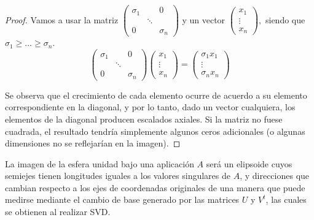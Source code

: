 \begin{proof} Vamos a usar la matriz $\begin{pmatrix}
			\sigma_1 &        & 0        \\
			         & \ddots &          \\
			0        &        & \sigma_n
		\end{pmatrix}$ y un vector $\begin{pmatrix}
			x_1    \\
			\vdots \\
			x_n
		\end{pmatrix},$ siendo que $\sigma_1 \geq \dots \geq \sigma_n$.
	\[\begin{pmatrix}
			\sigma_1 &        & 0        \\
			         & \ddots &          \\
			0        &        & \sigma_n
		\end{pmatrix}
		\begin{pmatrix}
			x_1    \\
			\vdots \\
			x_n
		\end{pmatrix}
		=
		\begin{pmatrix}
			\sigma_1 x_1 \\
			\vdots       \\
			\sigma_n x_n
		\end{pmatrix}
	\]

	Se observa que el crecimiento de cada elemento ocurre de acuerdo a su elemento correspondiente en la diagonal, y por lo tanto, dado un vector cualquiera, los elementos de la diagonal producen escalados axiales. Si la matriz no fuese cuadrada, el resultado tendría simplemente algunos ceros adicionales (o algunas dimensiones no se reflejarían en la imagen).
\end{proof}

\begin{theorem} La imagen de la esfera unidad bajo una aplicación $A$ será un elipsoide cuyos semiejes tienen longitudes iguales a los valores singulares de $A$, y direcciones que cambian respecto a los ejes de coordenadas originales de una manera que puede medirse mediante el cambio de base generado por las matrices $U$ y $V^t$, las cuales se obtienen al realizar SVD.
\end{theorem}

